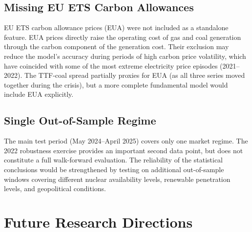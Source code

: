 \subsection{Missing EU ETS Carbon Allowances}

EU ETS carbon allowance prices (EUA) were not included as a standalone feature.
EUA prices directly raise the operating cost of gas and coal generation through
the carbon component of the generation cost. Their exclusion may reduce the
model's accuracy during periods of high carbon price volatility, which have
coincided with some of the most extreme electricity price episodes (2021--2022).
The TTF-coal spread partially proxies for EUA (as all three series moved
together during the crisis), but a more complete fundamental model would include
EUA explicitly.

\subsection{Single Out-of-Sample Regime}

The main test period (May 2024--April 2025) covers only one market regime.
The 2022 robustness exercise provides an important second data point, but does
not constitute a full walk-forward evaluation. The reliability of the
statistical conclusions would be strengthened by testing on additional
out-of-sample windows covering different nuclear availability levels, renewable
penetration levels, and geopolitical conditions.

\section{Future Research Directions}

